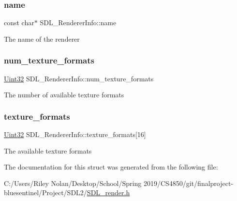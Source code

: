\subsubsection{\texorpdfstring{name}{name}}
{\footnotesize\ttfamily const char$\ast$ S\+D\+L\+\_\+\+Renderer\+Info\+::name}

The name of the renderer \mbox{\label{struct_s_d_l___renderer_info_acdec165b2053b914313f5996983ec6b8}} 
\subsubsection{\texorpdfstring{num\_texture\_formats}{num\_texture\_formats}}
{\footnotesize\ttfamily \mbox{\hyperlink{_s_d_l__stdinc_8h_add440eff171ea5f55cb00c4a9ab8672d}{Uint32}} S\+D\+L\+\_\+\+Renderer\+Info\+::num\+\_\+texture\+\_\+formats}

The number of available texture formats \mbox{\label{struct_s_d_l___renderer_info_a88450f9d48e593ec4571e3ba7cc3427d}} 
\subsubsection{\texorpdfstring{texture\_formats}{texture\_formats}}
{\footnotesize\ttfamily \mbox{\hyperlink{_s_d_l__stdinc_8h_add440eff171ea5f55cb00c4a9ab8672d}{Uint32}} S\+D\+L\+\_\+\+Renderer\+Info\+::texture\+\_\+formats\mbox{[}16\mbox{]}}

The available texture formats 

The documentation for this struct was generated from the following file\+:\begin{DoxyCompactItemize}
\item 
C\+:/\+Users/\+Riley Nolan/\+Desktop/\+School/\+Spring 2019/\+C\+S4850/git/finalproject-\/bluesentinel/\+Project/\+S\+D\+L2/\mbox{\hyperlink{_s_d_l__render_8h}{S\+D\+L\+\_\+render.\+h}}\end{DoxyCompactItemize}
